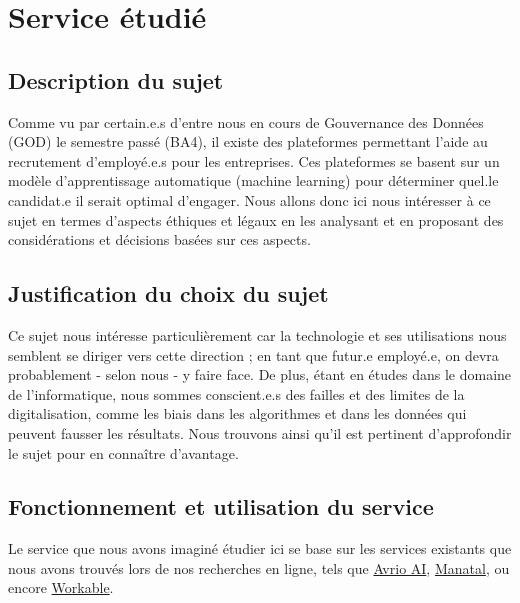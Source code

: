 \section{Service étudié}\label{section:description_projet}

\subsection{Description du sujet}
Comme vu par certain.e.s d’entre nous en cours de Gouvernance des Données (GOD) le semestre passé (BA4), il existe des plateformes permettant l’aide au recrutement d’employé.e.s pour les entreprises. Ces plateformes se basent sur un modèle d'apprentissage automatique (machine learning) pour déterminer quel.le candidat.e il serait optimal d’engager. Nous allons donc ici nous intéresser à ce sujet en termes d’aspects éthiques et légaux en les analysant et en proposant des considérations et décisions basées sur ces aspects.

\subsection{Justification du choix du sujet}
Ce sujet nous intéresse particulièrement car la technologie et ses utilisations nous semblent se diriger vers cette direction ; en tant que futur.e employé.e, on devra probablement - selon nous - y faire face. De plus, étant en études dans le domaine de l’informatique, nous sommes conscient.e.s des failles et des limites de la digitalisation, comme les biais dans les algorithmes et dans les données qui peuvent fausser les résultats. Nous trouvons ainsi qu’il est pertinent d’approfondir le sujet pour en connaître d’avantage.

\subsection{Fonctionnement et utilisation du service}
Le service que nous avons imaginé étudier ici se base sur les services existants que nous avons trouvés lors de nos recherches en ligne, tels que \href{https://www.avrioai.com}{Avrio AI}, \href{https://www.manatal.com/?matchtype=e&adposition=&locphysicalid=1003191&device=c&utm_source=google&utm_medium=cpc&utm_term=ai%20recruiting%20software&utm_campaign=Switzerland_Search%20%7C%20Generic%20&%20Competitor%20Terms%20-%20ST&hsa_ver=3&hsa_ad=593873401673&hsa_cam=16975333135&hsa_tgt=kwd-382632061851&hsa_net=adwords&hsa_grp=135358698146&hsa_mt=e&hsa_src=g&hsa_kw=ai%20recruiting%20software&hsa_acc=9327528136&gclid=CjwKCAiAwomeBhBWEiwAM43YIBCeUxhnE7AhArtbkOJ4XJ5QOkSP0W2lle4zfltyFzJruynzU8IqUhoCOVwQAvD_BwE}{Manatal}, ou encore \href{https://www.workable.com}{Workable}.

